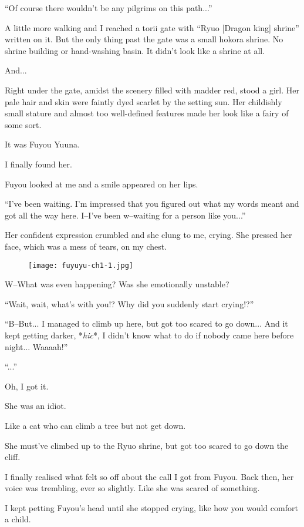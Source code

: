 ``Of course there wouldn't be any pilgrims on this path...''

A little more walking and I reached a torii gate with ``Ryuo [Dragon king] shrine'' written on it. But the only thing past the gate was a small hokora shrine. No shrine building or hand-washing basin. It didn't look like a shrine at all.

And...

Right under the gate, amidst the scenery filled with madder red, stood a girl. Her pale hair and skin were faintly dyed scarlet by the setting sun. Her childishly small stature and almost too well-defined features made her look like a fairy of some sort.

It was Fuyou Yuuna.

I finally found her.

Fuyou looked at me and a smile appeared on her lips.

``I've been waiting. I'm impressed that you figured out what my words meant and got all the way here. I--I've been w--waiting for a person like you...''

Her confident expression crumbled and she clung to me, crying. She pressed her face, which was a mess of tears, on my chest.

\begin{figure}[p]
\texttt{[image: fuyuyu-ch1-1.jpg]}
\end{figure}

W--What was even happening? Was she emotionally unstable?

``Wait, wait, what's with you!? Why did you suddenly start crying!?''

``B--But... I managed to climb up here, but got too scared to go down... And it kept getting darker, *\textit{hic}*, I didn't know what to do if nobody came here before night... Waaaah!''

``...''

Oh, I got it.

She was an idiot.

Like a cat who can climb a tree but not get down.

She must've climbed up to the Ryuo shrine, but got too scared to go down the cliff.

I finally realised what felt so off about the call I got from Fuyou. Back then, her voice was trembling, ever so slightly. Like she was scared of something.

I kept petting Fuyou's head until she stopped crying, like how you would comfort a child.

